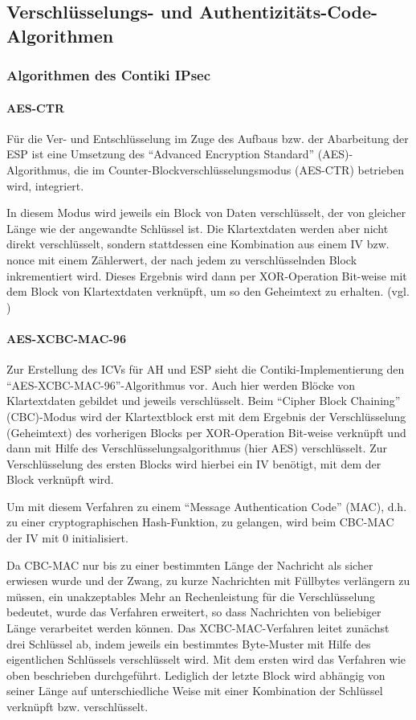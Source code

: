 \subsection{Ver\-schlüs\-se\-lungs- und Au\-then\-ti\-zi\-täts-Code-Algo\-rithmen}

\subsubsection{Algorithmen des Contiki IPsec}

\paragraph{AES-CTR}
Für die Ver- und Entschlüsselung im Zuge des Aufbaus bzw. der Abarbeitung der ESP ist eine Umsetzung des “Advanced Encryption Standard” (AES)-Algorithmus, die im Counter-Blockverschlüsselungsmodus (AES-CTR) betrieben wird, integriert.

In diesem Modus wird jeweils ein Block von Daten verschlüsselt, der von gleicher Länge wie der angewandte Schlüssel ist. Die Klartextdaten werden aber nicht direkt verschlüsselt, sondern stattdessen eine Kombination aus einem IV bzw. nonce mit einem Zählerwert, der nach jedem zu verschlüsselnden Block inkrementiert wird. Dieses Ergebnis wird dann per XOR-Operation Bit-weise mit dem Block von Klartextdaten verknüpft, um so den Geheimtext zu erhalten.
(vgl. \cite{RFC3686})

\paragraph{AES-XCBC-MAC-96}
Zur Erstellung des ICVs für AH und ESP sieht die Contiki-Implementierung den “AES-XCBC-MAC-96”-Algorithmus vor. Auch hier werden Blöcke von Klartextdaten gebildet und jeweils ver\-schlüs\-selt. Beim “Cipher Block Chaining” (CBC)-Modus wird der Klartextblock erst mit dem Ergebnis der Verschlüsselung (Geheimtext) des vorherigen Blocks per XOR-Operation Bit-weise verknüpft und dann mit Hilfe des Ver\-schlüs\-se\-lungs\-al\-go\-rithmus (hier AES) verschlüsselt. Zur Verschlüsselung des ersten Blocks wird hierbei ein IV benötigt, mit dem der Block verknüpft wird.

Um mit diesem Verfahren zu einem “Message Authentication Code” (MAC), d.h. zu einer cryptographischen Hash-Funktion, zu gelangen, wird beim CBC-MAC der IV mit 0 initialisiert.

Da CBC-MAC nur bis zu einer bestimmten Länge der Nachricht als sicher erwiesen wurde und der Zwang, zu kurze Nachrichten mit Füllbytes verlängern zu müssen, ein unakzeptables Mehr an Rechenleistung für die Verschlüsselung bedeutet, wurde das Verfahren erweitert, so dass Nachrichten von beliebiger Länge verarbeitet werden können. Das XCBC-MAC-Verfahren leitet zunächst drei Schlüssel ab, indem jeweils ein bestimmtes Byte-Muster mit Hilfe des eigentlichen Schlüssels verschlüsselt wird. Mit dem ersten wird das Verfahren wie oben beschrieben durchgeführt. Lediglich der letzte Block wird abhängig von seiner Länge auf unterschiedliche Weise mit einer Kombination der Schlüssel verknüpft bzw. verschlüsselt.

